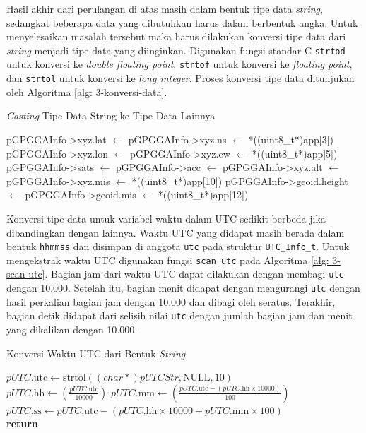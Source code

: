 Hasil akhir dari perulangan di atas masih dalam bentuk tipe data \textit{string}, sedangkat beberapa data yang dibutuhkan harus dalam berbentuk angka. Untuk menyelesaikan masalah tersebut maka harus dilakukan konversi tipe data dari \textit{string} menjadi tipe data yang diinginkan. Digunakan fungsi standar C \texttt{strtod} untuk konversi ke \textit{double floating point}, \texttt{strtof} untuk konversi ke \textit{floating point}, dan \texttt{strtol} untuk konversi ke \textit{long integer}. Proses konversi tipe data ditunjukan oleh Algoritma \ref{alg: 3-konversi-data}.

\begin{algorithm}[H]
	\caption{\textit{Casting} Tipe Data String ke Tipe Data Lainnya}
	\label{alg: 3-konversi-data}
	\begin{algorithmic}[1]
	\State pGPGGAInfo->xyz.lat $\gets$ 
	\State pGPGGAInfo->xyz.ns $\gets$ *((uint8\_t*)app[3])
	\State pGPGGAInfo->xyz.lon $\gets$ 
	\State pGPGGAInfo->xyz.ew $\gets$ *((uint8\_t*)app[5])
	\State pGPGGAInfo->sats $\gets$ 
	\State pGPGGAInfo->acc $\gets$ 
	\State pGPGGAInfo->xyz.alt $\gets$ 
	\State pGPGGAInfo->xyz.mis $\gets$ *((uint8\_t*)app[10])
	\State pGPGGAInfo->geoid.height $\gets$ 
	\State pGPGGAInfo->geoid.mis $\gets$ *((uint8\_t*)app[12])	
	\end{algorithmic}
\end{algorithm}

Konversi tipe data untuk variabel waktu dalam UTC sedikit berbeda jika dibandingkan dengan lainnya. Waktu UTC yang didapat masih berada dalam bentuk \texttt{hhmmss} dan disimpan di anggota \texttt{utc} pada struktur \texttt{UTC\_Info\_t}. Untuk mengekstrak waktu UTC digunakan fungsi \texttt{scan\_utc} pada Algoritma \ref{alg: 3-scan-utc}. Bagian jam dari waktu UTC dapat dilakukan dengan membagi \texttt{utc} dengan 10.000. Setelah itu, bagian menit didapat dengan mengurangi \texttt{utc} dengan hasil perkalian bagian jam dengan 10.000 dan dibagi oleh seratus. Terakhir, bagian detik didapat dari selisih nilai \texttt{utc} dengan jumlah bagian jam dan menit yang dikalikan dengan 10.000.

\begin{algorithm}[H]
	\caption{Konversi Waktu UTC dari Bentuk \textit{String}}
	\label{alg: 3-scan-utc}
	\begin{algorithmic}[1]
		\State $pUTC.\text{utc} \gets \text{strtol}((char *)pUTCStr, \text{NULL}, 10)$
		\\
		\State $pUTC.\text{hh} \gets \left(\frac{pUTC.\text{utc}}{10000}\right)$
		\State $pUTC.\text{mm} \gets \left(\frac{pUTC.\text{utc} - (pUTC.\text{hh} \times 10000)}{100}\right)$
		\State $pUTC.\text{ss} \gets pUTC.\text{utc} - (pUTC.\text{hh} \times 10000 + pUTC.\text{mm} \times 100)$
		\\
		\State \textbf{return}
	\EndProcedure
	\end{algorithmic}
\end{algorithm}

